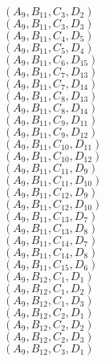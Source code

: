 \documentclass[14pt]{article}
\begin{document}
    $({A}_{9}, {B}_{11}, {C}_{3}, {D}_{2}) $ \\ 
    $({A}_{9}, {B}_{11}, {C}_{3}, {D}_{3}) $ \\ 
    $({A}_{9}, {B}_{11}, {C}_{4}, {D}_{5}) $ \\ 
    $({A}_{9}, {B}_{11}, {C}_{5}, {D}_{4}) $ \\ 
    $({A}_{9}, {B}_{11}, {C}_{6}, {D}_{15}) $ \\ 
    $({A}_{9}, {B}_{11}, {C}_{7}, {D}_{13}) $ \\ 
    $({A}_{9}, {B}_{11}, {C}_{7}, {D}_{14}) $ \\ 
    $({A}_{9}, {B}_{11}, {C}_{8}, {D}_{13}) $ \\ 
    $({A}_{9}, {B}_{11}, {C}_{8}, {D}_{14}) $ \\ 
    $({A}_{9}, {B}_{11}, {C}_{9}, {D}_{11}) $ \\ 
    $({A}_{9}, {B}_{11}, {C}_{9}, {D}_{12}) $ \\ 
    $({A}_{9}, {B}_{11}, {C}_{10}, {D}_{11}) $ \\ 
    $({A}_{9}, {B}_{11}, {C}_{10}, {D}_{12}) $ \\ 
    $({A}_{9}, {B}_{11}, {C}_{11}, {D}_{9}) $ \\ 
    $({A}_{9}, {B}_{11}, {C}_{11}, {D}_{10}) $ \\ 
    $({A}_{9}, {B}_{11}, {C}_{12}, {D}_{9}) $ \\ 
    $({A}_{9}, {B}_{11}, {C}_{12}, {D}_{10}) $ \\ 
    $({A}_{9}, {B}_{11}, {C}_{13}, {D}_{7}) $ \\ 
    $({A}_{9}, {B}_{11}, {C}_{13}, {D}_{8}) $ \\ 
    $({A}_{9}, {B}_{11}, {C}_{14}, {D}_{7}) $ \\ 
    $({A}_{9}, {B}_{11}, {C}_{14}, {D}_{8}) $ \\ 
    $({A}_{9}, {B}_{11}, {C}_{15}, {D}_{6}) $ \\ 
    $({A}_{9}, {B}_{12}, {C}_{1}, {D}_{1}) $ \\ 
    $({A}_{9}, {B}_{12}, {C}_{1}, {D}_{2}) $ \\ 
    $({A}_{9}, {B}_{12}, {C}_{1}, {D}_{3}) $ \\ 
    $({A}_{9}, {B}_{12}, {C}_{2}, {D}_{1}) $ \\ 
    $({A}_{9}, {B}_{12}, {C}_{2}, {D}_{2}) $ \\ 
    $({A}_{9}, {B}_{12}, {C}_{2}, {D}_{3}) $ \\ 
    $({A}_{9}, {B}_{12}, {C}_{3}, {D}_{1}) $ \\ 
\end{document}
